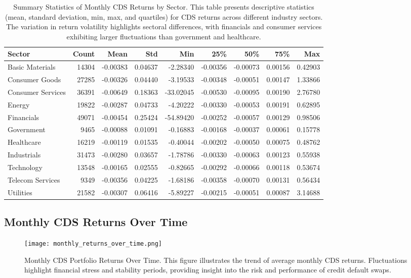 \documentclass{article}
\begin{document}
\begin{table}[h]
\centering
\begin{tabular}{lrrrrrrrr}
\toprule
Sector & Count & Mean & Std & Min & 25\% & 50\% & 75\% & Max \\
\midrule
Basic Materials & 14304 & -0.00383 & 0.04637 & -2.28340 & -0.00356 & -0.00073 & 0.00156 & 0.42903 \\
Consumer Goods & 27285 & -0.00326 & 0.04440 & -3.19533 & -0.00348 & -0.00051 & 0.00147 & 1.33866 \\
Consumer Services & 36391 & -0.00649 & 0.18363 & -33.02045 & -0.00530 & -0.00095 & 0.00190 & 2.76780 \\
Energy & 19822 & -0.00287 & 0.04733 & -4.20222 & -0.00330 & -0.00053 & 0.00191 & 0.62895 \\
Financials & 49071 & -0.00454 & 0.25424 & -54.89420 & -0.00252 & -0.00057 & 0.00129 & 0.98506 \\
Government & 9465 & -0.00088 & 0.01091 & -0.16883 & -0.00168 & -0.00037 & 0.00061 & 0.15778 \\
Healthcare & 16219 & -0.00119 & 0.01535 & -0.40044 & -0.00202 & -0.00050 & 0.00075 & 0.48762 \\
Industrials & 31473 & -0.00280 & 0.03657 & -1.78786 & -0.00330 & -0.00063 & 0.00123 & 0.55938 \\
Technology & 13548 & -0.00165 & 0.02555 & -0.82665 & -0.00292 & -0.00066 & 0.00118 & 0.53674 \\
Telecom Services & 9349 & -0.00356 & 0.04225 & -1.68186 & -0.00358 & -0.00070 & 0.00131 & 0.56434 \\
Utilities & 21582 & -0.00307 & 0.06416 & -5.89227 & -0.00215 & -0.00051 & 0.00087 & 3.14688 \\
\bottomrule
\end{tabular}
\caption{\label{tab:sector_cds_stats} Summary Statistics of Monthly CDS Returns by Sector. 
This table presents descriptive statistics (mean, standard deviation, min, max, and quartiles) 
for CDS returns across different industry sectors. The variation in return volatility highlights sectoral differences, 
with financials and consumer services exhibiting larger fluctuations than government and healthcare.}
\end{table}

\subsection{Monthly CDS Returns Over Time}
\begin{figure}[h]
    \centering
    \texttt{[image: monthly\_returns\_over\_time.png]}  %
    \caption{\label{fig:monthly_cds_returns} Monthly CDS Portfolio Returns Over Time. 
This figure illustrates the trend of average monthly CDS returns. 
Fluctuations highlight financial stress and stability periods, providing insight into the risk and performance of credit default swaps.}
\end{figure}
\end{document}
